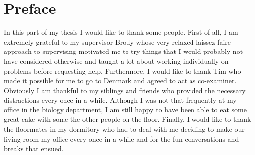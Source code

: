 \chapter{Preface}
\label{ch:Preface}
In this part of my thesis I would like to thank some people. First of all, I am extremely grateful to my supervisor Brody whose very relaxed laissez-faire approach to supervising motivated me to try things that I would probably not have considered otherwise and taught a lot about working individually on problems before requesting help. Furthermore, I would like to thank Tim who made it possible for me to go to Denmark and agreed to act as co-examiner. Obviously I am thankful to my siblings and friends who provided the necessary distractions every once in a while. Although I was not that frequently at my office in the biology department, I am still happy to have been able to eat some great cake with some the other people on the floor.  Finally, I would like to thank the floormates in my dormitory who had to deal with me deciding to make our living room my office every once in a while and for the fun conversations and breaks that ensued.